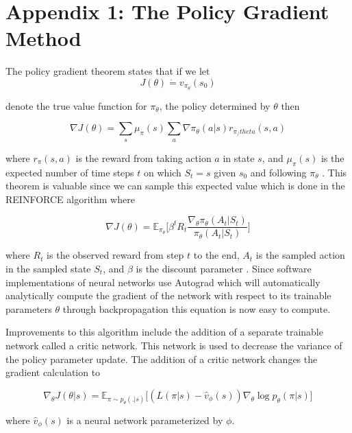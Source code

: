 \documentclass[12pt]{article}
\begin{document}
\section*{Appendix 1: The Policy Gradient Method}

The policy gradient theorem states that if we let
\begin{equation*}
  J(\theta)\dot{=}v_{\pi_{\theta}}(s_0)
\end{equation*}

denote the true value function for $\pi_\theta$, the policy determined by $\theta$ then

\begin{equation*}
  \nabla J(\theta)=\sum_s \mu_\pi(s)\sum_a \nabla \pi_\theta(a|s)r_{\pi_/theta}(s,a)
\end{equation*}

where $r_\pi(s,a)$ is the reward from taking action $a$ in state $s$, and $\mu_\pi(s)$ is the expected number of time steps $t$ on which $S_t=s$ given $s_0$ and following $\pi_\theta$ \citep{1998_Sutton}. This theorem is valuable since we can sample this expected value which is done in the REINFORCE algorithm where

\begin{equation*}
  \nabla J(\theta)=\mathbb{E}_{\pi_\theta}\bigg[ \beta^tR_t\frac{\nabla_\theta\pi_\theta(A_t|S_t)}{\pi_\theta(A_t|S_t)}\bigg]
\end{equation*}

where $R_t$ is the observed reward from step $t$ to the end, $A_t$ is the sampled action in the sampled state $S_t$, and $\beta$ is the discount parameter \citep{1992_Williams}. Since software implementations of neural networks use Autograd which will automatically analytically compute the gradient of the network with respect to its trainable parameters $\theta$ through backpropagation this equation is now easy to compute.

Improvements to this algorithm include the addition of a separate trainable network called a critic network. This network is used to decrease the variance of the policy parameter update. The addition of a critic network changes the gradient calculation to

\begin{equation*}
  \nabla_\theta J(\theta|s)=\mathbb{E}_{\pi \sim p_\theta(.|s)}\bigg[ (L(\pi|s)-\hat{v}_\phi(s))\nabla_\theta \log p_\theta(\pi|s) \bigg]
\end{equation*}

where $\hat{v}_\phi(s)$ is a neural network parameterized by $\phi$.
\end{document}
